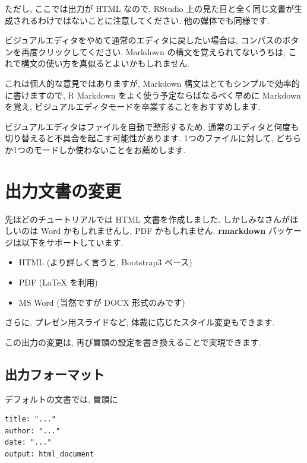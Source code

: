 \documentclass[
]{ltjsarticle}
\providecommand{\tightlist}{%
  \setlength{\itemsep}{0pt}\setlength{\parskip}{0pt}}
\newenvironment{infobox}[1]{\begin{itemize}\renewcommand{\labelitemi}{\raisebox{-.7\height}[0pt][0pt]{%
  {\setkeys{Gin}{width=3em,keepaspectratio}\texttt{[image: \_latex/\_img/\#1]}}}}
  \setlength{\fboxsep}{1em}
  \begin{greyblock}
  \item
  }{\end{greyblock}\end{itemize}
}
\begin{document}
ただし, ここでは出力が HTML なので, RStudio 上の見た目と全く同じ文書が生成されるわけではないことに注意してください. 他の媒体でも同様です.

ビジュアルエディタをやめて通常のエディタに戻したい場合は, コンパスのボタンを再度クリックしてください. Markdown の構文を覚えられてないうちは, これで構文の使い方を真似るとよいかもしれません.

これは個人的な意見ではありますが, Markdown 構文はとてもシンプルで効率的に書けますので, R Markdown をよく使う予定ならばなるべく早めに Markdown を覚え, ビジュアルエディタモードを卒業することをおすすめします.

\begin{infobox}{important}
ビジュアルエディタはファイルを自動で整形するため, 通常のエディタと何度も切り替えると不具合を起こす可能性があります. 1つのファイルに対して, どちらか1つのモードしか使わないことをお薦めします.

\end{infobox}

\hypertarget{outputs}{%
\section{出力文書の変更}\label{outputs}}

先ほどのチュートリアルでは HTML 文書を作成しました. しかしみなさんがほしいのは Word かもしれませんし, PDF かもしれません. \textbf{rmarkdown} パッケージは以下をサポートしています.

\begin{itemize}
\tightlist
\item
  HTML (より詳しく言うと, Bootstrap3 ベース)
\item
  PDF (LaTeX を利用)
\item
  MS Word (当然ですが DOCX 形式のみです)
\end{itemize}

さらに, プレゼン用スライドなど, 体裁に応じたスタイル変更もできます.

この出力の変更は, 再び冒頭の設定を書き換えることで実現できます.

\hypertarget{ux51faux529bux30d5ux30a9ux30fcux30deux30c3ux30c8}{%
\subsection{出力フォーマット}\label{ux51faux529bux30d5ux30a9ux30fcux30deux30c3ux30c8}}

デフォルトの文書では, 冒頭に

\begin{verbatim}
title: "..."
author: "..."
date: "..."
output: html_document
\end{verbatim}
\end{document}
